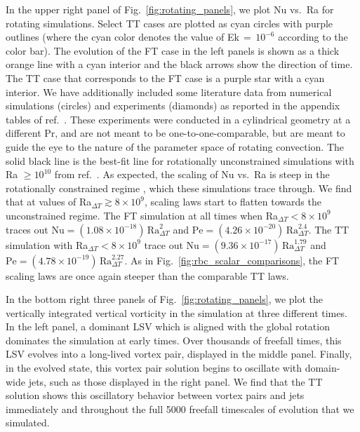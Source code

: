 \documentclass[aps, pre, onecolumn, nofootinbib, notitlepage, groupedaddress, amsfonts, amssymb, amsmath, longbibliography, superscriptaddress]{revtex4-1}
\newcommand{\ea}[1]{{\color{red} #1}}
\begin{document}
In the upper right panel of Fig.~\ref{fig:rotating_panels}, we plot Nu vs.~Ra for rotating simulations.
Select TT cases are plotted as cyan circles with purple outlines (where the cyan color denotes the value of Ek$\,=\,10^{-6}$ according to the color bar).
The evolution of the FT case in the left panels is shown as a thick orange line with a cyan interior and the black arrows show the direction of time.
The TT case that corresponds to the FT case is a purple star with a cyan interior.
We have additionally included some literature data from numerical simulations (circles) and experiments (diamonds) as reported in the appendix tables of ref.~\cite{cheng&all2015}.
These experiments were conducted in a cylindrical geometry at a different Pr, and are not meant to be one-to-one-comparable, but are meant to guide the eye to the nature of the parameter space of rotating convection.
The solid black line is the best-fit line for rotationally unconstrained simulations with Ra $\geq 10^{10}$ from ref.~\cite{cheng&all2015}.
As expected, the scaling of Nu vs.~Ra is steep in the rotationally constrained regime \cite{julien&all2012, plumley&julien2019}, which these simulations trace through.
\ea{We find that at values of Ra$_{\Delta T} \gtrsim 8 \times 10^9$, scaling laws start to flatten towards the unconstrained regime.
The FT simulation at all times when Ra$_{\Delta T} < 8 \times 10^9$ traces out $\text{Nu} = (1.08 \times 10^{-18})\,\text{Ra}_{\Delta T}^{2}$ and $\text{Pe} = (4.26 \times 10^{-20})\,\text{Ra}_{\Delta T}^{2.4}$.
The TT simulation with Ra$_{\Delta T} < 8 \times 10^9$ trace out $\text{Nu} = (9.36 \times 10^{-17})\,\text{Ra}_{\Delta T}^{1.79}$ and $\text{Pe} = (4.78 \times 10^{-19})\,\text{Ra}_{\Delta T}^{2.27}$.}
As in Fig.~\ref{fig:rbc_scalar_comparisons}, the FT \ea{scaling laws} are once again \ea{steeper than} the comparable TT \ea{laws}.

In the bottom right three panels of Fig.~\ref{fig:rotating_panels}, we plot the vertically integrated vertical vorticity in the simulation at three different times.
In the left panel, a dominant LSV which is aligned with the global rotation dominates the simulation at early times.
Over thousands of freefall times, this LSV evolves into a long-lived vortex pair, displayed in the middle panel.
Finally, in the evolved state, this vortex pair solution begins to oscillate with domain-wide jets, such as those displayed in the right panel.
We find that the TT solution shows this oscillatory behavior between vortex pairs and jets immediately and throughout the full 5000 freefall timescales of evolution that we simulated.
\end{document}
